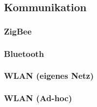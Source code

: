 \subsection{Kommunikation}

\subsubsection{ZigBee}

\subsubsection{Bluetooth}

\subsubsection{WLAN (eigenes Netz)}

\subsubsection{WLAN (Ad-hoc)}